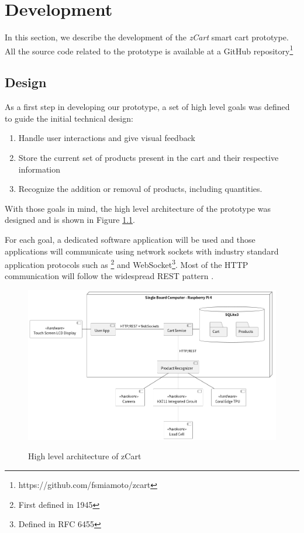 \chapter{Development} \label{chap:desenv}

In this section, we describe the development of the \textit{zCart} smart cart
prototype. All the source code related to the prototype is available at a
GitHub repository\footnote{https://github.com/fsmiamoto/zcart}

\section{Design}
\label{sec:design}

As a first step in developing our prototype, a set of
high level goals was defined to guide the initial technical design:

\begin{enumerate}
    \item Handle user interactions and give visual feedback
    \item Store the current set of products present in the cart and their respective information
    \item Recognize the addition or removal of products, including quantities.
\end{enumerate}

With those goals in mind, the high level architecture of the prototype
was designed and is shown in Figure \ref{fig:architecture}.

For each goal, a dedicated software application will be used and those
applications will communicate using 
network sockets \cite{Kurose2013} with industry standard application protocols such as
\footnote{First defined in
 1945} and WebSocket\footnote{Defined in RFC 6455}.
Most of the HTTP communication will follow the widespread REST pattern \cite{Roy2000}.

\begin{figure}[H]
	\centering
	\caption[High level architecture of zCart]{High level architecture of zCart}
    \includegraphics[width=1\textwidth]{./images/zCart.png}
	\fonte{}
	\label{fig:architecture}
\end{figure}

